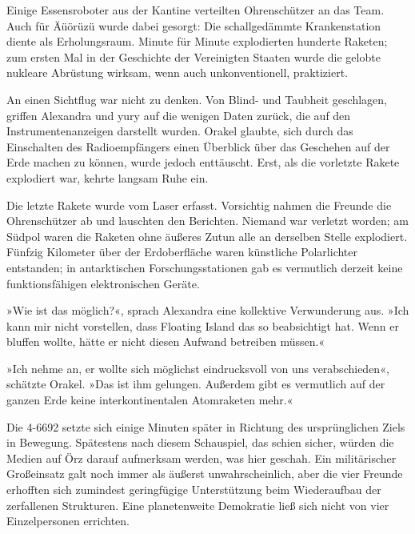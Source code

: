 Einige Essensroboter aus der Kantine verteilten Ohrenschützer an das Team. Auch für Äüörüzü wurde dabei gesorgt: Die schallgedämmte Krankenstation diente als Erholungsraum. Minute für Minute explodierten hunderte Raketen; zum ersten Mal in der Geschichte der Vereinigten Staaten wurde die gelobte nukleare Abrüstung wirksam, wenn auch unkonventionell, praktiziert.

An einen Sichtflug war nicht zu denken. Von Blind- und Taubheit geschlagen, griffen Alexandra und yury auf die wenigen Daten zurück, die auf den Instrumentenanzeigen darstellt wurden. Orakel glaubte, sich durch das Einschalten des Radioempfängers einen Überblick über das Geschehen auf der Erde machen zu können, wurde jedoch enttäuscht. Erst, als die vorletzte Rakete explodiert war, kehrte langsam Ruhe ein.


Die letzte Rakete wurde vom Laser erfasst. Vorsichtig nahmen die Freunde die Ohrenschützer ab und lauschten den Berichten. Niemand war verletzt worden; am Südpol waren die Raketen ohne äußeres Zutun alle an derselben Stelle explodiert. Fünfzig Kilometer über der Erdoberfläche waren künstliche Polarlichter entstanden; in antarktischen Forschungsstationen gab es vermutlich derzeit keine funktionsfähigen elektronischen Geräte.

»Wie ist das möglich?«, sprach Alexandra eine kollektive Verwunderung aus. »Ich kann mir nicht vorstellen, dass Floating Island das so beabsichtigt hat. Wenn er bluffen wollte, hätte er nicht diesen Aufwand betreiben müssen.«

»Ich nehme an, er wollte sich möglichst eindrucksvoll von uns verabschieden«, schätzte Orakel. »Das ist ihm gelungen. Außerdem gibt es vermutlich auf der ganzen Erde keine interkontinentalen Atomraketen mehr.«

Die 4-6692 setzte sich einige Minuten später in Richtung des ursprünglichen Ziels in Bewegung. Spätestens nach diesem Schauspiel, das schien sicher, würden die Medien auf Örz darauf aufmerksam werden, was hier geschah. Ein militärischer Großeinsatz galt noch immer als äußerst unwahrscheinlich, aber die vier Freunde erhofften sich zumindest geringfügige Unterstützung beim Wiederaufbau der zerfallenen Strukturen. Eine planetenweite Demokratie ließ sich nicht von vier Einzelpersonen errichten.

